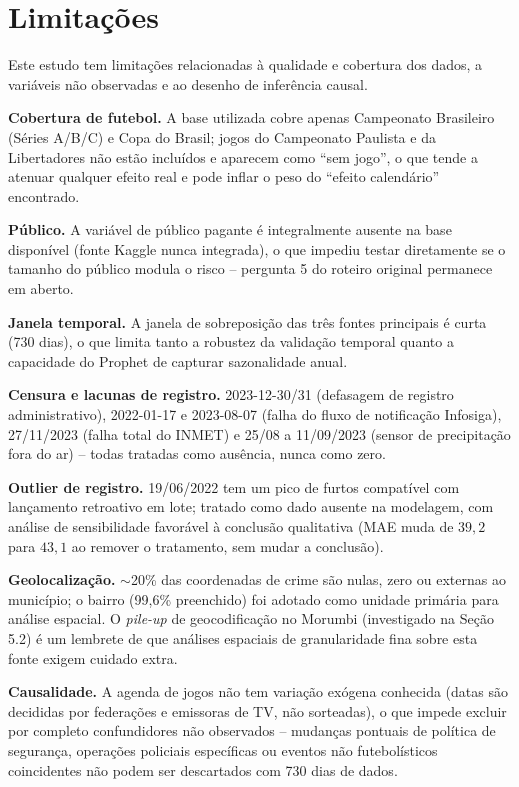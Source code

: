 \documentclass[12pt]{article}
\begin{document}
\section{Limitações}
\label{sec:limitacoes}

Este estudo tem limitações relacionadas à qualidade e cobertura dos
dados, a variáveis não observadas e ao desenho de inferência causal.

\textbf{Cobertura de futebol.} A base utilizada cobre apenas Campeonato
Brasileiro (Séries A/B/C) e Copa do Brasil; jogos do Campeonato Paulista
e da Libertadores não estão incluídos e aparecem como ``sem jogo'', o que
tende a atenuar qualquer efeito real e pode inflar o peso do ``efeito
calendário'' encontrado.

\textbf{Público.} A variável de público pagante é integralmente ausente
na base disponível (fonte Kaggle nunca integrada), o que impediu testar
diretamente se o tamanho do público modula o risco -- pergunta 5 do
roteiro original permanece em aberto.

\textbf{Janela temporal.} A janela de sobreposição das três fontes
principais é curta (730 dias), o que limita tanto a robustez da
validação temporal quanto a capacidade do Prophet de capturar
sazonalidade anual.

\textbf{Censura e lacunas de registro.} 2023-12-30/31 (defasagem de
registro administrativo), 2022-01-17 e 2023-08-07 (falha do fluxo de
notificação Infosiga), 27/11/2023 (falha total do INMET) e 25/08 a
11/09/2023 (sensor de precipitação fora do ar) -- todas tratadas como
ausência, nunca como zero.

\textbf{Outlier de registro.} 19/06/2022 tem um pico de furtos compatível
com lançamento retroativo em lote; tratado como dado ausente na
modelagem, com análise de sensibilidade favorável à conclusão
qualitativa (MAE muda de $39,2$ para $43,1$ ao remover o tratamento, sem
mudar a conclusão).

\textbf{Geolocalização.} $\sim$20\% das coordenadas de crime são nulas,
zero ou externas ao município; o bairro (99,6\% preenchido) foi adotado
como unidade primária para análise espacial. O \emph{pile-up} de
geocodificação no Morumbi (investigado na Seção 5.2) é um lembrete de que
análises espaciais de granularidade fina sobre esta fonte exigem cuidado
extra.

\textbf{Causalidade.} A agenda de jogos não tem variação exógena
conhecida (datas são decididas por federações e emissoras de TV, não
sorteadas), o que impede excluir por completo confundidores não
observados -- mudanças pontuais de política de segurança, operações
policiais específicas ou eventos não futebolísticos coincidentes não
podem ser descartados com 730 dias de dados.
\end{document}
